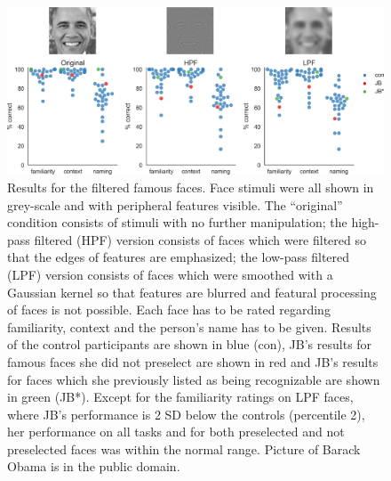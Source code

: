 \documentclass[fleqn,10pt]{SelfArx} %
\begin{document}
 \begin{figure}[htbp]
 	\begin{minipage}{\textwidth}
 		\renewcommand{\familydefault}{\sfdefault}\normalfont
 		\centering
 		\includegraphics[width=\columnwidth]{../reports/figures/filterface_main_figure_mod.png}
 		\vspace*{-3mm}
 		\caption{Results for the filtered famous faces. Face stimuli were all shown in grey-scale and with peripheral features visible. The “original” condition consists of stimuli with no further manipulation; the high-pass filtered (HPF) version consists of faces which were filtered so that the edges of features are emphasized; the low-pass filtered (LPF) version consists of faces which were smoothed with a Gaussian kernel so that features are blurred and featural processing of faces is not possible. Each face has to be rated regarding familiarity, context and the person's name has to be given. Results of the control participants are shown in blue (con), JB's results for famous faces she did not preselect are shown in red and JB's results for faces which she previously listed as being recognizable are shown in green (JB*). Except for the familiarity ratings on LPF faces, where JB's performance is 2 SD below the controls (percentile 2), her performance on all tasks and for both preselected and not preselected faces was within the normal range. Picture of Barack Obama is in the public domain.}%
 		\label{fig:filtered}
 	\end{minipage}
 \end{figure}
 
\end{document}
